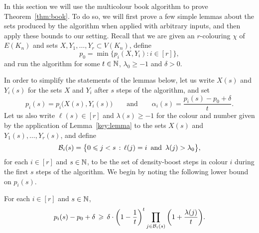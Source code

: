 In this section we will use the multicolour book algorithm to prove Theorem~\ref{thm:book}. To do so, we will first prove a few simple lemmas about the sets produced by the algorithm when applied with arbitrary inputs, and then apply these bounds to our setting. Recall that we are given an \(r\)-colouring \(\chi\) of \(E(K_n)\) and
sets \(X,Y_1,\ldots,Y_r \subset V(K_n)\), define
%
\begin{equation}
	\label{def:p0}
	p_0 = \min\big\{ p_i(X,Y_i) : i \in [r] \big\},
\end{equation}
%
and run the algorithm for some \(t \in \mathbb{N}\), \(\lambda_0 \ge -1\) and \(\delta > 0\).

In order to simplify the statements of the lemmas below, let us write \(X(s)\) and \(Y_i(s)\) for the sets \(X\) and \(Y_i\) after \(s\) steps of the algorithm, and set
%
\begin{equation*}
	p_i(s) = p_i\big( X(s), Y_i(s) \big) \qquad \text{and} \qquad \alpha_i(s) = \frac{p_i(s) - p_0 + \delta}{t}.
\end{equation*}
%
Let us also write \(\ell(s) \in [r]\) and \(\lambda(s) \ge -1\) for the colour and number given by the application of Lemma~\ref{key:lemma} to the sets \(X(s)\) and \(Y_1(s),\dots,Y_r(s)\), and define
%
\begin{equation*}
	\mathcal{B}_i(s) = \big\{ 0 \leqslant j < s \,:\, \ell(j) = i \, \text{ and } \, \lambda(j) > \lambda_0 \big\},
\end{equation*}
%
for each \(i \in [r]\) and \(s \in \mathbb{N}\), to be the set of density-boost steps in colour \(i\) during the first \(s\) steps of the algorithm. We begin by noting the following lower bound on \(p_i(s)\).


\begin{lemma}
  \label{lem:pi:lower:bound} %
  For each \(i \in [r]\) and \(s \in \mathbb{N}\), 
  \begin{equation}\label{eq:pi:lower:bound}
    p_i(s) - p_0 + \delta \, \geqslant \, \delta \cdot \bigg( 1 - \frac{1}{t} \bigg)^{t} \prod_{j \in \mathcal{B}_i(s)} \bigg( 1 + \frac{\lambda(j)}{t} \bigg).
  \end{equation}
\end{lemma}


